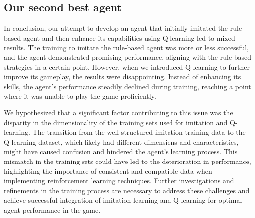 \subsection{Our second best agent}

In conclusion, our attempt to develop an agent that initially imitated the rule-based agent and then enhance its capabilities using Q-learning led 
to mixed results. The training to imitate the rule-based agent was more or less successful, and the agent demonstrated promising performance, aligning with the rule-based 
strategies in a certain point. However, when we introduced Q-learning to further improve its gameplay, the results were disappointing. Instead of enhancing its skills, 
the agent's performance steadily declined during training, reaching a point where it was unable to play the game proficiently.

We hypothesized that a significant factor contributing to this issue was the disparity in the dimensionality of the training sets 
used for imitation and Q-learning. The transition from the well-structured imitation training data to the Q-learning dataset, which likely 
had different dimensions and characteristics, might have caused confusion and hindered the agent's learning process. This mismatch in the training sets 
could have led to the deterioration in performance, highlighting the importance of consistent and compatible data when implementing reinforcement learning techniques. 
Further investigations and refinements in the training process are necessary to address these challenges and achieve successful integration of imitation learning and
Q-learning for optimal agent performance in the game.